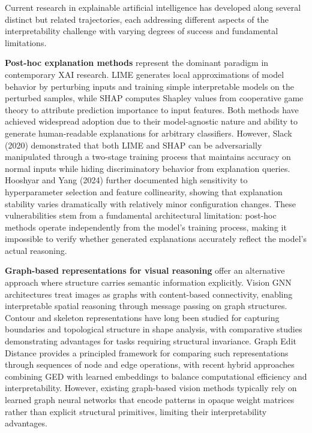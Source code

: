\documentclass[a4paper,10pt]{article}
\begin{document}
Current research in explainable artificial intelligence has developed along several distinct but related trajectories, each addressing different aspects of the interpretability challenge with varying degrees of success and fundamental limitations.

\textbf{Post-hoc explanation methods} represent the dominant paradigm in contemporary XAI research. LIME generates local approximations of model behavior by perturbing inputs and training simple interpretable models on the perturbed samples, while SHAP computes Shapley values from cooperative game theory to attribute prediction importance to input features. Both methods have achieved widespread adoption due to their model-agnostic nature and ability to generate human-readable explanations for arbitrary classifiers. However, Slack (2020) demonstrated that both LIME and SHAP can be adversarially manipulated through a two-stage training process that maintains accuracy on normal inputs while hiding discriminatory behavior from explanation queries. Hooshyar and Yang (2024) further documented high sensitivity to hyperparameter selection and feature collinearity, showing that explanation stability varies dramatically with relatively minor configuration changes. These vulnerabilities stem from a fundamental architectural limitation: post-hoc methods operate independently from the model's training process, making it impossible to verify whether generated explanations accurately reflect the model's actual reasoning.

\textbf{Graph-based representations for visual reasoning} offer an alternative approach where structure carries semantic information explicitly. Vision GNN architectures treat images as graphs with content-based connectivity, enabling interpretable spatial reasoning through message passing on graph structures. Contour and skeleton representations have long been studied for capturing boundaries and topological structure in shape analysis, with comparative studies demonstrating advantages for tasks requiring structural invariance. Graph Edit Distance provides a principled framework for comparing such representations through sequences of node and edge operations, with recent hybrid approaches combining GED with learned embeddings to balance computational efficiency and interpretability. However, existing graph-based vision methods typically rely on learned graph neural networks that encode patterns in opaque weight matrices rather than explicit structural primitives, limiting their interpretability advantages.
\end{document}
